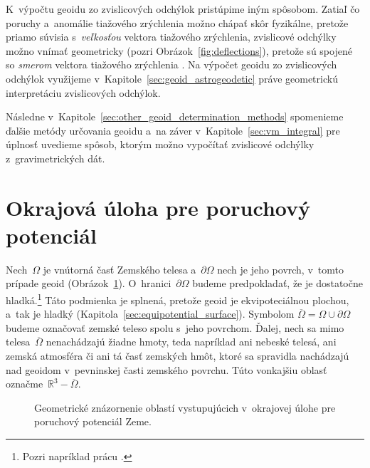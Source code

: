 \documentclass[a4paper,12pt]{book}
\begin{document}
K~výpočtu geoidu zo zvislicových odchýlok pristúpime iným spôsobom.  Zatiaľ čo 
poruchy a~anomálie tiažového zrýchlenia možno chápať skôr fyzikálne, pretože 
priamo súvisia s~\emph{veľkosťou} vektora tiažového zrýchlenia, zvislicové 
odchýlky možno vnímať geometricky (pozri Obrázok~\ref{fig:deflections}), 
pretože sú spojené so \emph{smerom} vektora tiažového zrýchlenia 
\parencite{MoritzPhysicalGeodesy}.  Na výpočet geoidu zo zvislicových odchýlok 
využijeme v~Kapitole~\ref{sec:geoid_astrogeodetic} práve geometrickú 
interpretáciu zvislicových odchýlok.

Následne v~Kapitole~\ref{sec:other_geoid_determination_methods} spomenieme 
ďalšie metódy určovania geoidu a~na záver v~Kapitole~\ref{sec:vm_integral} pre 
úplnosť uvedieme spôsob, ktorým možno vypočítať zvislicové odchýlky 
z~gravimetrických dát.


\section{Okrajová úloha pre poruchový potenciál}
\label{sec:boundary_value_problem}

Nech~$\Omega$ je vnútorná časť Zemského telesa a~$\partial \Omega$ nech je jeho 
povrch, v~tomto prípade geoid (Obrázok~\ref{fig:boundary_value_problems}).  
O~hranici~$\partial \Omega$ budeme predpokladať, že je dostatočne 
hladká.\footnote{Pozri napríklad prácu \textcite{SansoGeoidDetermination}.}  
Táto podmienka je splnená, pretože geoid je ekvipoteciálnou plochou, a~tak je 
hladký (Kapitola~\ref{sec:equipotential_surface}).  Symbolom $\overline{\Omega} 
= \Omega \cup \partial\Omega$ budeme označovať zemské teleso spolu s~jeho 
povrchom.  Ďalej, nech sa mimo telesa~$\overline{\Omega}$ nenachádzajú žiadne 
hmoty, teda napríklad ani nebeské telesá, ani zemská atmosféra či ani tá časť 
zemských hmôt, ktoré sa spravidla nachádzajú nad geoidom v~pevninskej časti 
zemského povrchu.  Túto vonkajšiu oblasť označme~$\mathbb{R}^3 
- \overline{\Omega}$.

\begin{figure}[bt]
\centering

\caption{Geometrické znázornenie oblastí vystupujúcich v~okrajovej úlohe pre 
poruchový potenciál Zeme.}
\label{fig:boundary_value_problems}
\end{figure}
\end{document}
